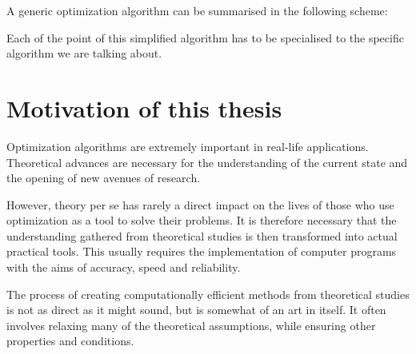 A generic optimization algorithm can be summarised in the following
scheme:


Each of the point of this simplified algorithm has to be specialised
to the specific algorithm we are talking about.

%
%
\section{Motivation of this thesis}

Optimization algorithms are extremely important in real-life 
applications. Theoretical advances are necessary for the 
understanding of the current state and the opening of new avenues 
of research. 

However, theory per se has rarely a direct impact on the lives 
of those who use optimization as a tool to solve their problems.
It is therefore necessary that the understanding gathered from
theoretical studies is then transformed into actual practical
tools. This usually requires the implementation of computer programs
with the aims of accuracy, speed and reliability.

The process of creating computationally efficient methods from
theoretical studies is not as direct as it might sound, but is somewhat
of an art in itself. It often involves relaxing many of the theoretical 
assumptions, while ensuring other properties and conditions.

